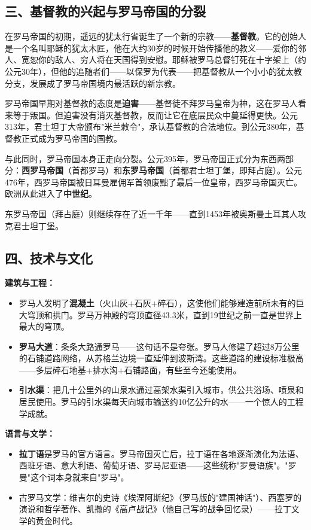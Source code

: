 \documentclass[a4paper,12pt]{ctexart}
\begin{document}
\subsection*{三、基督教的兴起与罗马帝国的分裂}

在罗马帝国的初期，遥远的犹太行省诞生了一个新的宗教——\textbf{基督教}。它的创始人是一个名叫耶稣的犹太木匠，他在大约30岁的时候开始传播他的教义——爱你的邻人、宽恕你的敌人、穷人将在天国得到安慰。耶稣被罗马总督钉死在十字架上（约公元30年），但他的追随者们——以保罗为代表——把基督教从一个小小的犹太教分支，发展成了罗马帝国境内最活跃的新宗教。

罗马帝国早期对基督教的态度是\textbf{迫害}——基督徒不拜罗马皇帝为神，这在罗马人看来等于叛国。但迫害没有消灭基督教，反而让它在底层民众中蔓延得更快。公元313年，君士坦丁大帝颁布"米兰敕令"，承认基督教的合法地位。到公元380年，基督教正式成为罗马帝国的国教。

与此同时，罗马帝国本身正走向分裂。公元395年，罗马帝国正式分为东西两部分：\textbf{西罗马帝国}（首都罗马）和\textbf{东罗马帝国}（首都君士坦丁堡，即拜占庭）。公元476年，西罗马帝国被日耳曼雇佣军首领废黜了最后一位皇帝，西罗马帝国灭亡。欧洲从此进入了\textbf{中世纪}。

东罗马帝国（拜占庭）则继续存在了近一千年——直到1453年被奥斯曼土耳其人攻克君士坦丁堡。

\subsection*{四、技术与文化}

\textbf{建筑与工程：}
\begin{itemize}
  \item 罗马人发明了\textbf{混凝土}（火山灰+石灰+碎石），这使他们能够建造前所未有的巨大穹顶和拱门。罗马万神殿的穹顶直径43.3米，直到19世纪之前一直是世界上最大的穹顶。
  \item \textbf{罗马大道}：条条大路通罗马——这句话不是夸张。罗马人修建了超过8万公里的石铺道路网络，从苏格兰边境一直延伸到波斯湾。这些道路的建设标准极高——多层碎石地基+排水沟+石铺路面，有些至今还能使用。
  \item \textbf{引水渠}：把几十公里外的山泉水通过高架水渠引入城市，供公共浴场、喷泉和居民使用。罗马的引水渠每天向城市输送约10亿公升的水——一个惊人的工程学成就。
\end{itemize}

\textbf{语言与文学：}
\begin{itemize}
  \item \textbf{拉丁语}是罗马的官方语言。罗马帝国灭亡后，拉丁语在各地逐渐演化为法语、西班牙语、意大利语、葡萄牙语、罗马尼亚语——这些统称"罗曼语族"。"罗曼"这个词本身就来自"罗马"。
  \item 古罗马文学：维吉尔的史诗《埃涅阿斯纪》（罗马版的"建国神话"）、西塞罗的演说和哲学著作、凯撒的《高卢战记》（他自己写的战争回忆录）——拉丁文学的黄金时代。
\end{itemize}
\end{document}
